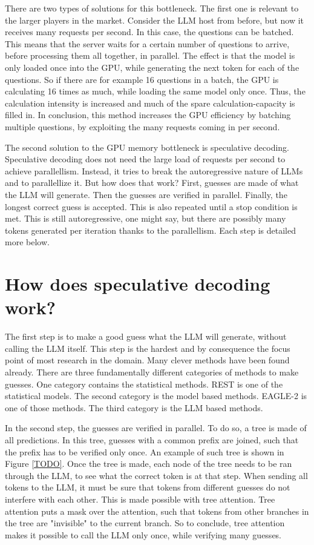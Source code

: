 There are two types of solutions for this bottleneck. The first one is relevant to the larger players in the market. Consider the LLM host from before, but now it receives many requests per second. In this case, the questions can be batched. This means that the server waits for a certain number of questions to arrive, before processing them all together, in parallel. The effect is that the model is only loaded once into the GPU, while generating the next token for each of the questions. So if there are for example 16 questions in a batch, the GPU is calculating 16 times as much, while loading the same model only once. Thus, the calculation intensity is increased and much of the spare calculation-capacity is filled in. In conclusion, this method increases the GPU efficiency by batching multiple questions, by exploiting the many requests coming in per second.

The second solution to the GPU memory bottleneck is speculative decoding. Speculative decoding does not need the large load of requests per second to achieve parallellism. Instead, it tries to break the autoregressive nature of LLMs and to parallellize it. But how does that work? First, guesses are made of what the LLM will generate. Then the guesses are verified in parallel. Finally, the longest correct guess is accepted. This is also repeated until a stop condition is met. This is still autoregressive, one might say, but there are possibly many tokens generated per iteration thanks to the parallellism. Each step is detailed more below.

\section{How does speculative decoding work?}

The first step is to make a good guess what the LLM will generate, without calling the LLM itself. This step is the hardest and by consequence the focus point of most research in the domain. Many clever methods have been found already. There are three fundamentally different categories of methods to make guesses. One category contains the statistical methods. REST is one of the statistical models. The second category is the model based methods. EAGLE-2 is one of those methods. The third category is the LLM based methods.

In the second step, the guesses are verified in parallel. To do so, a tree is made of all predictions. In this tree, guesses with a common prefix are joined, such that the prefix has to be verified only once. An example of such tree is shown in Figure \ref{TODO}. Once the tree is made, each node of the tree needs to be ran through the LLM, to see what the correct token is at that step. When sending all tokens to the LLM, it must be sure that tokens from different guesses do not interfere with each other. This is made possible with tree attention. Tree attention puts a mask over the attention, such that tokens from other branches in the tree are "invisible" to the current branch. So to conclude, tree attention makes it possible to call the LLM only once, while verifying many guesses.

